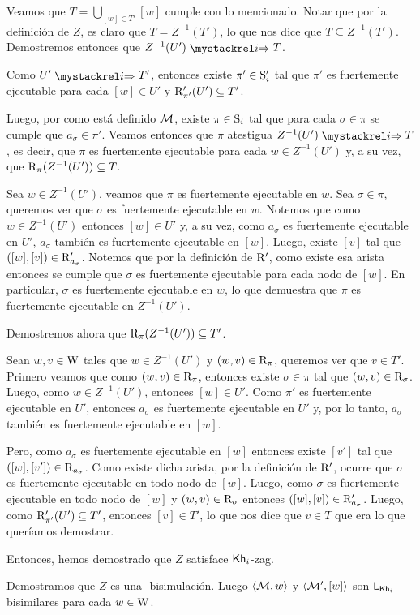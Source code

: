 \begin{demostracion}
\begin{itemize}
        Veamos que $T = \bigcup\limits_{[w] \in T'} [w]$ cumple con lo mencionado. Notar que por la definición de $Z$, es claro que $T = Z^{-1}(T')$, lo que nos dice que $T \subseteq Z^{-1}(T')$. Demostremos entonces que $Z^{-1}(U') \ultsExecAgi T$. 
    
        Como $U' \ultsExecAgi T'$, entonces existe $\pi' \in \S_i'$ tal que $\pi'$ es fuertemente ejecutable para cada $[w] \in U'$ y $\R'_{\pi'}(U') \subseteq T'$.

        Luego, por como está definido $\modults$, existe $\pi \in \S_i$ tal que para cada $\sigma \in \pi$ se cumple que $a_\sigma \in \pi'$. 
        Veamos entonces que $\pi$ atestigua $Z^{-1}(U') \ultsExecAgi T$, es decir, que $\pi$ es fuertemente ejecutable para cada $w \in Z^{-1}(U')$ 
        y, a su vez, que $\R_\pi(Z^{-1}(U')) \subseteq T$.

        Sea $w \in Z^{-1}(U')$, veamos que $\pi$ es fuertemente ejecutable en $w$. Sea $\sigma \in \pi$, queremos ver que $\sigma$ es fuertemente ejecutable 
        en $w$. Notemos que como $w \in Z^{-1}(U')$ entonces $[w] \in U'$ y, a su vez, como $a_\sigma$ es fuertemente ejecutable en $U'$, $a_\sigma$ también es fuertemente ejecutable en $[w]$. 
        Luego, existe $[v]$ tal que $([w],[v]) \in \R'_{a_\sigma}$. Notemos que por la definición de $\R'$, como existe esa arista entonces se cumple que $\sigma$ es fuertemente ejecutable 
        para cada nodo de $[w]$. En particular, $\sigma$ es fuertemente ejecutable en $w$, lo que demuestra que $\pi$ es fuertemente ejecutable 
        en $Z^{-1}(U')$.

        Demostremos ahora que $\R_{\pi}(Z^{-1}(U')) \subseteq T'$. 

        Sean $w, v \in \W$ tales que $w \in Z^{-1}(U')$ y $(w,v) \in \R_\pi$, queremos ver que $v \in T'$. Primero veamos que como $(w,v) \in \R_\pi$, 
        entonces existe $\sigma \in \pi$ tal que $(w,v) \in \R_\sigma$. Luego, como $w \in Z^{-1}(U')$, entonces $[w] \in U'$. Como $\pi'$ es fuertemente 
        ejecutable en $U'$, entonces $a_\sigma$ es fuertemente ejecutable en $U'$ y, por lo tanto, $a_\sigma$ también es fuertemente ejecutable en $[w]$.
        
        Pero, como $a_\sigma$ es fuertemente ejecutable en $[w]$ entonces existe $[v']$ tal que $([w],[v']) \in \R_{a_\sigma}$. 
        Como existe dicha arista, por la definición de $\R'$, ocurre que $\sigma$ es fuertemente ejecutable en todo nodo de $[w]$. 
        Luego, como $\sigma$ es fuertemente ejecutable en todo nodo de $[w]$ y $(w,v) \in \R_\sigma$ entonces $([w],[v]) \in \R'_{a_\sigma}$. 
        Luego, como $\R'_{\pi'}(U') \subseteq T'$, entonces $[v] \in T'$, lo que nos dice que $v \in T$ que era lo que queríamos demostrar.

        Entonces, hemos demostrado que $Z$ satisface $\khi$-zag.
    \end{itemize}
    Demostramos que $Z$ es una \KHilogic-bisimulación. Luego $\tup{\modults,w}$ y $\tup{\modults',[w]}$ son $\KHilogic$-bisimilares para cada $w \in \W$.
\end{demostracion}



